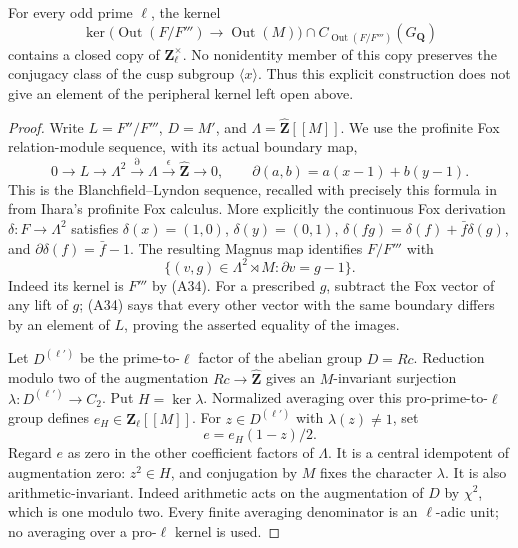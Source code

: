 \begin{proposition}
\label{A:last-layer-unrestricted}
For every odd prime $\ell$, the kernel
\[
 \ker\bigl(\operatorname{Out}(F/F''')\to\operatorname{Out}(M)\bigr)
       \cap C_{\operatorname{Out}(F/F''')}(G_{\mathbf Q})
\]
contains a closed copy of $\mathbf Z_\ell^\times$.
No nonidentity member of this copy preserves the
conjugacy class of the cusp subgroup $\langle x\rangle$.
Thus this explicit construction does not give an element
of the peripheral kernel left open above.
\end{proposition}
\begin{proof}
Write $L=F''/F'''$, $D=M'$, and
$\Lambda=\widehat{\mathbf Z}[[M]]$.
We use the profinite Fox relation-module sequence,
with its actual boundary map,
\[
 0\longrightarrow L\longrightarrow\Lambda^2
   \xrightarrow{\partial}\Lambda
   \xrightarrow\epsilon\widehat{\mathbf Z}\longrightarrow0,
 \qquad \partial(a,b)=a(x-1)+b(y-1).                         \tag{A34}
\]
This is the Blanchfield--Lyndon sequence, recalled
with precisely this formula in
\cite[Proposition 1.1]{A_Yamaguchi2026Centers} from
Ihara's profinite Fox calculus. More explicitly the
continuous Fox derivation $\delta:F\to\Lambda^2$
satisfies $\delta(x)=(1,0)$, $\delta(y)=(0,1)$,
$\delta(fg)=\delta(f)+\bar f\delta(g)$, and
$\partial\delta(f)=\bar f-1$.
The resulting Magnus map identifies $F/F'''$ with
\[
 \{(v,g)\in\Lambda^2\rtimes M:\partial v=g-1\}.             \tag{A35}
\]
Indeed its kernel is $F'''$ by (A34). For a prescribed
$g$, subtract the Fox vector of any lift of $g$;
(A34) says that every other vector with the same
boundary differs by an element of $L$, proving the
asserted equality of the images.

Let $D^{(\ell')}$ be the prime-to-$\ell$ factor of
the abelian group $D=Rc$. Reduction modulo two of
the augmentation $Rc\to\widehat{\mathbf Z}$ gives
an $M$-invariant surjection
$\lambda:D^{(\ell')}\to C_2$. Put $H=\ker\lambda$.
Normalized averaging over this pro-prime-to-$\ell$
group defines $e_H\in\mathbf Z_\ell[[M]]$.
For $z\in D^{(\ell')}$ with $\lambda(z)\ne1$, set
\[
                   e=e_H(1-z)/2.
\]
Regard $e$ as zero in the other coefficient factors
of $\Lambda$. It is a central idempotent of augmentation
zero: $z^2\in H$, and conjugation by $M$ fixes the
character $\lambda$. It is also arithmetic-invariant.
Indeed arithmetic acts on the augmentation of $D$
by $\chi^2$, which is one modulo two. Every finite
averaging denominator is an $\ell$-adic unit; no
averaging over a pro-$\ell$ kernel is used.


\end{proof}
